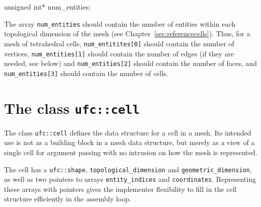 \begin{code}
unsigned int* num_entities;
\end{code}

The array \texttt{num\_entities} should contain the number of entities
within each topological dimension of the mesh (see
Chapter~\ref{sec:referencecells}). Thus, for a mesh of tetrahedral
cells, \texttt{num\_entitites[0]} should contain the number of
vertices, \texttt{num\_entities[1]} should contain the number of edges
(if they are needed, see below) and \texttt{num\_entities[2]} should
contain the number of faces, and \texttt{num\_entities[3]} should
contain the number of cells.

\section{The class \texttt{ufc::cell}}

The class \texttt{ufc::cell} defines the data structure for a cell in a mesh.
Its intended use is not as a building block in a mesh data structure, but merely as a view
of a single cell for argument passing with no intrusion on how the mesh is represented.










The cell has a \texttt{ufc::shape}, \texttt{topological\_dimension} and \texttt{geometric\_dimension},
as well as two pointers to arrays \texttt{entity\_indices} and \texttt{coordinates}.
Representing these arrays with pointers gives the implementer flexibility
to fill in the cell structure efficiently in the assembly loop.

